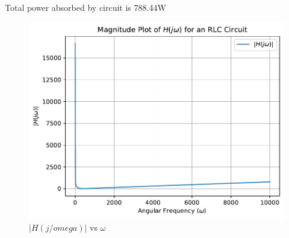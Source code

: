 \documentclass[journal,12pt,twocolumn]{IEEEtran}
\theoremstyle{remark}
\begin{document}
Total power absorbed by circuit is 788.44\hspace{0.01cm}W

\vspace{1cm}

\begin{figure}[h!]
	\centering
	\includegraphics[width=\columnwidth]{figs/garph1.pdf}
	\caption{$|H(j/omega)|$ vs $\omega$}
	\label{fig:magnitude_plot}
\end{figure}

 
\end{document}
